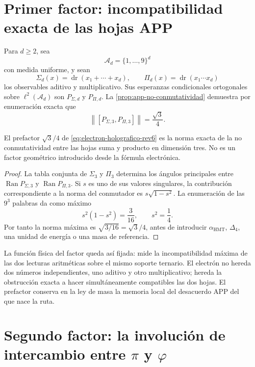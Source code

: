 \section{Primer factor: incompatibilidad exacta de las hojas APP}

Para \(d\geq2\), sea
\[
 \mathscr A_d=\{1,\ldots,9\}^d
\]
con medida uniforme, y sean
\[
 \Sigma_d(x)=\operatorname{dr}(x_1+\cdots+x_d),
 \qquad
 \Pi_d(x)=\operatorname{dr}(x_1\cdots x_d)
\]
los observables aditivo y multiplicativo. Sus esperanzas condicionales
ortogonales sobre \(\ell^2(\mathscr A_d)\) son
\(P_{\Sigma,d}\) y \(P_{\Pi,d}\). La
\cref{prop:app-no-conmutatividad} demuestra por enumeración exacta que
\[
 \left\|[P_{\Sigma,3},P_{\Pi,3}]\right\|
 =\frac{\sqrt3}{4}.
\]

\begin{proposition}
\label{prop:prefactor-app-electron-rev6}
El prefactor \(\sqrt3/4\) de
\cref{eq:electron-holografico-rev6} es la norma exacta de la
no conmutatividad entre las hojas suma y producto en dimensión tres.
No es un factor geométrico introducido desde la fórmula electrónica.
\end{proposition}

\begin{proof}
La tabla conjunta de \(\Sigma_3\) y \(\Pi_3\) determina los ángulos
principales entre
\(\operatorname{Ran}P_{\Sigma,3}\) y
\(\operatorname{Ran}P_{\Pi,3}\). Si \(s\) es uno de sus valores
singulares, la contribución correspondiente a la norma del conmutador es
\(s\sqrt{1-s^2}\). La enumeración de las \(9^3\) palabras da como máximo
\[
 s^2(1-s^2)=\frac3{16},
 \qquad s^2=\frac14.
\]
Por tanto la norma máxima es \(\sqrt{3/16}=\sqrt3/4\), antes de
introducir \(\alpha_{\mathrm{HMT}}\), \(\Delta_4\), una unidad de energía
o una masa de referencia.
\end{proof}

La función física del factor queda así fijada: mide la incompatibilidad
máxima de las dos lecturas aritméticas sobre el mismo soporte ternario. El
electrón no hereda dos números independientes, uno aditivo y otro
multiplicativo; hereda la obstrucción exacta a hacer simultáneamente
compatibles las dos hojas. El prefactor conserva en la ley de masa la
memoria local del desacuerdo APP del que nace la ruta.

\section{Segundo factor: la involución de intercambio entre
\texorpdfstring{\(\pi\) y \(\varphi\)}{pi y phi}}

